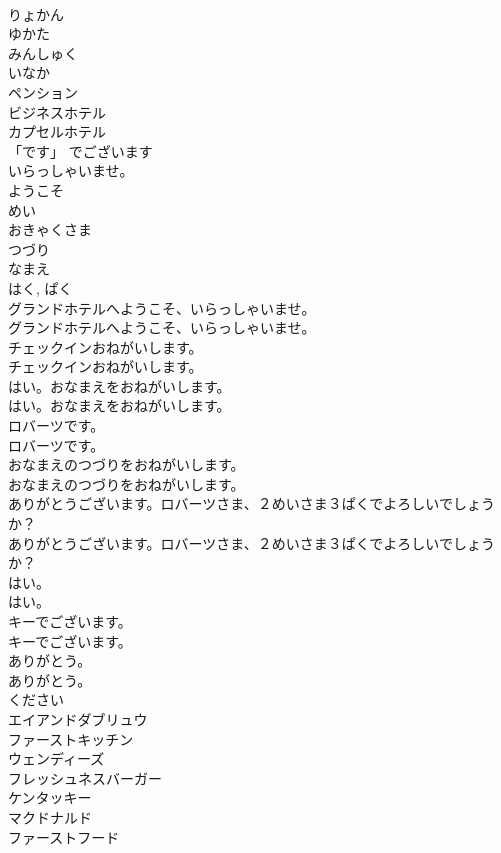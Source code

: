\documentclass[8pt]{extreport}
\begin{document}
\begin{CJK}{UTF8}{min}
\\	りょかん
\\	ゆかた
\\	みんしゅく
\\	いなか
\\	ペンション
\\	ビジネスホテル
\\	カプセルホテル
\\	「です」	でございます
\\	いらっしゃいませ。
\\	ようこそ
\\	めい
\\	おきゃくさま
\\	つづり
\\	なまえ
\\	はく, ぱく
\\	グランドホテルへようこそ、いらっしゃいませ。	
\\	グランドホテルへようこそ、いらっしゃいませ。 
\\	チェックインおねがいします。	
\\	チェックインおねがいします。 
\\	はい。おなまえをおねがいします。	
\\	はい。おなまえをおねがいします。 
\\	ロバーツです。	
\\	ロバーツです。 
\\	おなまえのつづりをおねがいします。	
\\	おなまえのつづりをおねがいします。 
\\	ありがとうございます。ロバーツさま、２めいさま３ぱくでよろしいでしょうか？	
\\	ありがとうございます。ロバーツさま、２めいさま３ぱくでよろしいでしょうか？ 
\\	はい。	
\\	はい。 
\\	キーでございます。	
\\	キーでございます。 
\\	ありがとう。	
\\	ありがとう。 
\\	ください
\\	エイアンドダブリュウ
\\	ファーストキッチン
\\	ウェンディーズ
\\	フレッシュネスバーガー
\\	ケンタッキー
\\	マクドナルド
\\	ファーストフード

\end{CJK}
\end{document}
